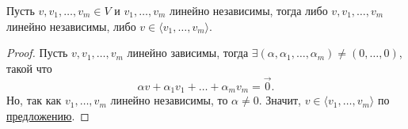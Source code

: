 \begin{lemma}
    Пусть $v, v_1, \dots, v_m \in V$ и $v_1, \dots, v_m$ линейно независимы, тогда либо $v, v_1, \dots, v_m$ линейно независимы, либо $v \in \langle v_1, \dots , v_m \rangle$.
\end{lemma}

\begin{proof}
    Пусть $v, v_1, \dots, v_m$ линейно зависимы, тогда $\exists (\alpha, \alpha_1, \dots, \alpha_m) \neq (0, \dots, 0)$, такой что
    \begin{equation*}
        \alpha v + \alpha_1 v_1 + \dots + \alpha_m v_m = \overrightarrow{0}
    .\end{equation*}
    Но, так как $v_1, \dots, v_m$ линейно независимы, то $\alpha \neq 0$. Значит, $v \in \langle v_1, \dots, v_m \rangle$ по \hyperref[lec11:proposal_a_i]{предложению}.
\end{proof}
